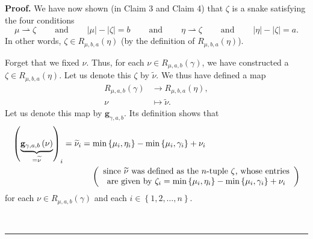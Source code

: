 \documentclass[numbers=enddot,12pt,final,onecolumn,notitlepage]{scrartcl}%
\theoremstyle{definition}
\newenvironment{proof}[1][Proof]{\noindent\textbf{#1.} }{\ \rule{0.5em}{0.5em}}
\begin{document}
\begin{proof}
We have now shown (in Claim 3 and Claim 4) that $\zeta$ is a snake satisfying
the four conditions%
\[
\mu\rightharpoonup\zeta\ \ \ \ \ \ \ \ \ \ \text{and}%
\ \ \ \ \ \ \ \ \ \ \left\vert \mu\right\vert -\left\vert \zeta\right\vert
=b\ \ \ \ \ \ \ \ \ \ \text{and}\ \ \ \ \ \ \ \ \ \ \eta\rightharpoonup
\zeta\ \ \ \ \ \ \ \ \ \ \text{and}\ \ \ \ \ \ \ \ \ \ \left\vert
\eta\right\vert -\left\vert \zeta\right\vert =a.
\]
In other words, $\zeta\in R_{\mu,b,a}\left(  \eta\right)  $ (by the definition
of $R_{\mu,b,a}\left(  \eta\right)  $).

Forget that we fixed $\nu$. Thus, for each $\nu\in R_{\mu,a,b}\left(
\gamma\right)  $, we have constructed a $\zeta\in R_{\mu,b,a}\left(
\eta\right)  $. Let us denote this $\zeta$ by $\widetilde{\nu}$. We thus have
defined a map%
\begin{align*}
R_{\mu,a,b}\left(  \gamma\right)   &  \rightarrow R_{\mu,b,a}\left(
\eta\right)  ,\\
\nu &  \mapsto\widetilde{\nu}.
\end{align*}
Let us denote this map by $\mathbf{g}_{\gamma,a,b}$. Its definition shows that%
\begin{align}
\left(  \underbrace{\mathbf{g}_{\gamma,a,b}\left(  \nu\right)  }%
_{=\widetilde{\nu}}\right)  _{i}  &  =\widetilde{\nu}_{i}=\min\left\{  \mu
_{i},\eta_{i}\right\}  -\min\left\{  \mu_{i},\gamma_{i}\right\}  +\nu
_{i}\label{pf.lem.fZ.lr.end1}\\
&  \ \ \ \ \ \ \ \ \ \ \left(
\begin{array}
[c]{c}%
\text{since }\widetilde{\nu}\text{ was defined as the }n\text{-tuple }%
\zeta\text{, whose entries}\\
\text{are given by }\zeta_{i}=\min\left\{  \mu_{i},\eta_{i}\right\}
-\min\left\{  \mu_{i},\gamma_{i}\right\}  +\nu_{i}%
\end{array}
\right) \nonumber
\end{align}
for each $\nu\in R_{\mu,a,b}\left(  \gamma\right)  $ and each $i\in\left\{
1,2,\ldots,n\right\}  $.


\end{proof}
\end{document}
